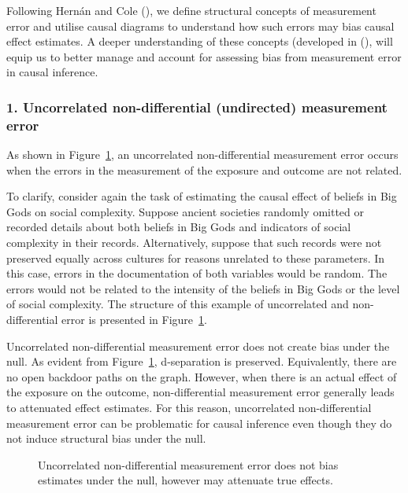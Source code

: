 \documentclass[
  singlecolumn]{article}
\begin{document}
Following Hernán and Cole (), we
define structural concepts of measurement error and utilise causal
diagrams to understand how such errors may bias causal effect estimates.
A deeper understanding of these concepts (developed in
(), will
equip us to better manage and account for assessing bias from
measurement error in causal inference.

\subsubsection{1. Uncorrelated non-differential (undirected) measurement
error}\label{uncorrelated-non-differential-undirected-measurement-error}

As shown in Figure~\ref{fig-dag-uu-null}, an uncorrelated
non-differential measurement error occurs when the errors in the
measurement of the exposure and outcome are not related.

To clarify, consider again the task of estimating the causal effect of
beliefs in Big Gods on social complexity. Suppose ancient societies
randomly omitted or recorded details about both beliefs in Big Gods and
indicators of social complexity in their records. Alternatively, suppose
that such records were not preserved equally across cultures for reasons
unrelated to these parameters. In this case, errors in the documentation
of both variables would be random. The errors would not be related to
the intensity of the beliefs in Big Gods or the level of social
complexity. The structure of this example of uncorrelated and
non-differential error is presented in Figure~\ref{fig-dag-uu-null}.

Uncorrelated non-differential measurement error does not create bias
under the null. As evident from Figure~\ref{fig-dag-uu-null},
d-separation is preserved. Equivalently, there are no open backdoor
paths on the graph. However, when there is an actual effect of the
exposure on the outcome, non-differential measurement error generally
leads to attenuated effect estimates. For this reason, uncorrelated
non-differential measurement error can be problematic for causal
inference even though they do not induce structural bias under the null.

\begin{figure}


\caption{\label{fig-dag-uu-null}Uncorrelated non-differential
measurement error does not bias estimates under the null, however may
attenuate true effects.}

\end{figure}%
\end{document}
